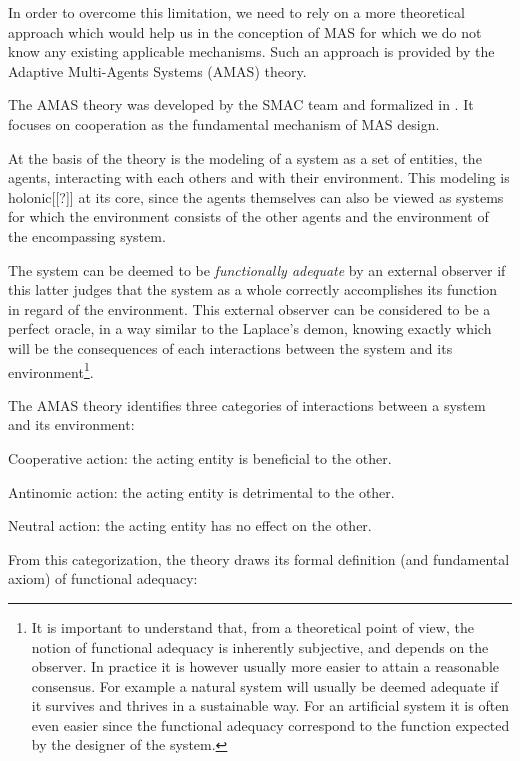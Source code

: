 In order to overcome this limitation, we need to rely on a more theoretical approach which would help us in the conception of MAS for which we do not know any existing applicable mechanisms. Such an approach is provided by the Adaptive Multi-Agents Systems (AMAS) theory.

The AMAS theory was developed by the SMAC team and formalized in \cite{glize2001adaptation}. It focuses on cooperation as the fundamental mechanism of MAS design.

At the basis of the theory is the modeling of a system as a set of entities, the agents, interacting with each others and with their environment. This modeling is holonic[[?]] at its core, since the agents themselves can also be viewed as systems for which the environment consists of the other agents and the environment of the encompassing system.

The system can be deemed to be \emph{functionally adequate} by an external observer if this latter judges that the system as a whole correctly accomplishes its function in regard of the environment. This external observer can be considered to be a perfect oracle, in a way similar to the Laplace's demon, knowing exactly which will be the consequences of each interactions between the system and its environment\footnote{It is important to understand that, from a theoretical point of view, the notion of functional adequacy is inherently subjective, and depends on the observer. In practice it is however usually more easier to attain a reasonable consensus. For example a natural system will usually be deemed adequate if it survives and thrives in a sustainable way. For an artificial system it is often even easier since the functional adequacy correspond to the function expected by the designer of the system.}.

The AMAS theory identifies three categories of interactions between a system and its environment:
\begin{compactitem}
\item Cooperative action: the acting entity is beneficial to the other.
\item Antinomic action: the acting entity is detrimental to the other.
\item Neutral action: the acting entity has no effect on the other.
\end{compactitem}

From this categorization, the theory draws its formal definition (and fundamental axiom) of functional adequacy:

